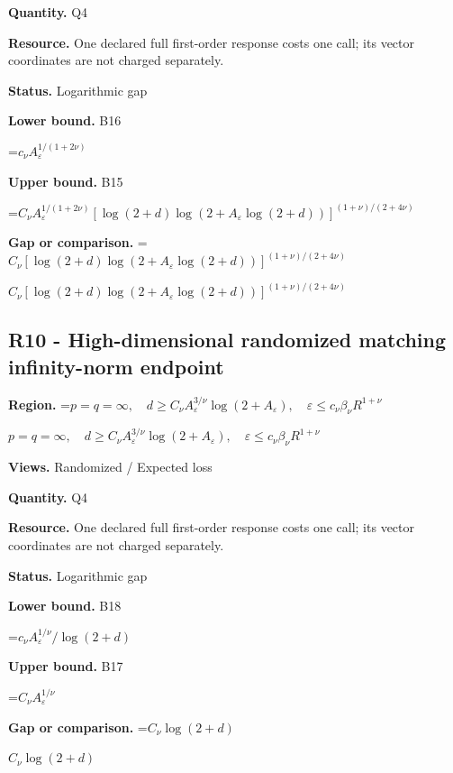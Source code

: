 \documentclass[10pt,a4paper]{article}
\newcommand{\AtlasMath}[1]{\par\begingroup\centering\setbox0=\hbox{$\displaystyle #1$}\ifdim\wd0>1.4\linewidth\typeout{ATLAS WIDE FORMULA: \the\wd0}\fi\ifdim\wd0>\linewidth\resizebox{\linewidth}{!}{\box0}\else\box0\fi\par\endgroup}
\newcommand{\AtlasInlineMath}[1]{\begingroup\setbox0=\hbox{$#1$}\ifdim\wd0>.4\linewidth\endgroup\AtlasMath{#1}\else\endgroup$#1$\fi}
\begin{document}
\textbf{Quantity.} Q4



\textbf{Resource.} One declared full first-order response costs one call; its vector coordinates are not charged separately.



\textbf{Status.} Logarithmic gap



\textbf{Lower bound.} B16



\AtlasMath{c_\nu A_\varepsilon^{1/(1+2\nu)}}


\textbf{Upper bound.} B15



\AtlasMath{C_\nu A_\varepsilon^{1/(1+2\nu)}[\log(2+d)\log(2+A_\varepsilon\log(2+d))]^{(1+\nu)/(2+4\nu)}}


\textbf{Gap or comparison.} \AtlasInlineMath{C_\nu[\log(2+d)\log(2+A_\varepsilon\log(2+d))]^{(1+\nu)/(2+4\nu)}}



\subsection{R10 - High-dimensional randomized matching infinity-norm endpoint}


\textbf{Region.} \AtlasInlineMath{p=q=\infty,\quad d\ge C_\nu A_\varepsilon^{3/\nu}\log(2+A_\varepsilon),\quad\varepsilon\le c_\nu\beta_\nu R^{1+\nu}}



\textbf{Views.} Randomized / Expected loss



\textbf{Quantity.} Q4



\textbf{Resource.} One declared full first-order response costs one call; its vector coordinates are not charged separately.



\textbf{Status.} Logarithmic gap



\textbf{Lower bound.} B18



\AtlasMath{c_\nu A_\varepsilon^{1/\nu}/\log(2+d)}


\textbf{Upper bound.} B17



\AtlasMath{C_\nu A_\varepsilon^{1/\nu}}


\textbf{Gap or comparison.} \AtlasInlineMath{C_\nu\log(2+d)}
\end{document}

